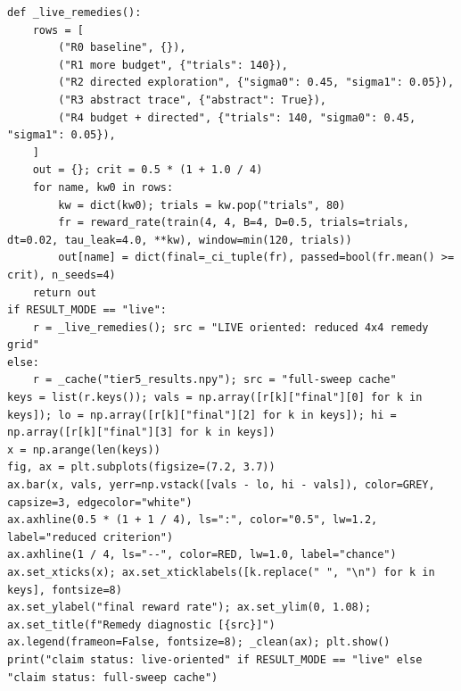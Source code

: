 \begin{lstlisting}[caption={02\_closed\_loop\_rl.ipynb code cell 4},label={lst:mrl-nb-02-closed-loop-rl-4}]
def _live_remedies():
    rows = [
        ("R0 baseline", {}),
        ("R1 more budget", {"trials": 140}),
        ("R2 directed exploration", {"sigma0": 0.45, "sigma1": 0.05}),
        ("R3 abstract trace", {"abstract": True}),
        ("R4 budget + directed", {"trials": 140, "sigma0": 0.45, "sigma1": 0.05}),
    ]
    out = {}; crit = 0.5 * (1 + 1.0 / 4)
    for name, kw0 in rows:
        kw = dict(kw0); trials = kw.pop("trials", 80)
        fr = reward_rate(train(4, 4, B=4, D=0.5, trials=trials, dt=0.02, tau_leak=4.0, **kw), window=min(120, trials))
        out[name] = dict(final=_ci_tuple(fr), passed=bool(fr.mean() >= crit), n_seeds=4)
    return out
if RESULT_MODE == "live":
    r = _live_remedies(); src = "LIVE oriented: reduced 4x4 remedy grid"
else:
    r = _cache("tier5_results.npy"); src = "full-sweep cache"
keys = list(r.keys()); vals = np.array([r[k]["final"][0] for k in keys]); lo = np.array([r[k]["final"][2] for k in keys]); hi = np.array([r[k]["final"][3] for k in keys])
x = np.arange(len(keys))
fig, ax = plt.subplots(figsize=(7.2, 3.7))
ax.bar(x, vals, yerr=np.vstack([vals - lo, hi - vals]), color=GREY, capsize=3, edgecolor="white")
ax.axhline(0.5 * (1 + 1 / 4), ls=":", color="0.5", lw=1.2, label="reduced criterion")
ax.axhline(1 / 4, ls="--", color=RED, lw=1.0, label="chance")
ax.set_xticks(x); ax.set_xticklabels([k.replace(" ", "\n") for k in keys], fontsize=8)
ax.set_ylabel("final reward rate"); ax.set_ylim(0, 1.08); ax.set_title(f"Remedy diagnostic [{src}]")
ax.legend(frameon=False, fontsize=8); _clean(ax); plt.show()
print("claim status: live-oriented" if RESULT_MODE == "live" else "claim status: full-sweep cache")
\end{lstlisting}

